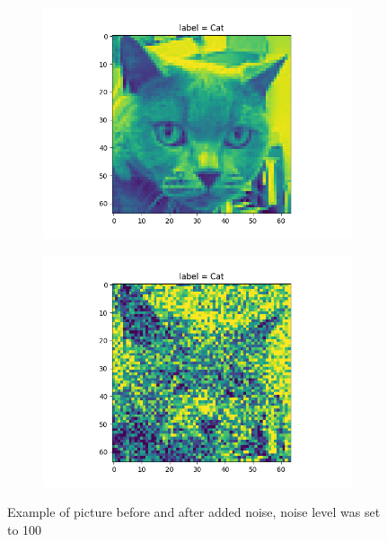\documentclass{article}
\begin{document}
\begin{figure}[H]
\begin{subfigure}{.5\textwidth}
  \centering
  \includegraphics[width=1\linewidth]{2a/pic.png}  
  
  \label{fig:sub-first}
\end{subfigure}
\begin{subfigure}{.5\textwidth}
  \centering
  \includegraphics[width=1\linewidth]{2a/Noisy pic.png}  
  
  \label{fig:sub-second}
\end{subfigure}
\caption{Example of picture before and after added noise, noise level was set to 100}
\label{noise pics}
\end{figure}
\newpage
\end{document}
